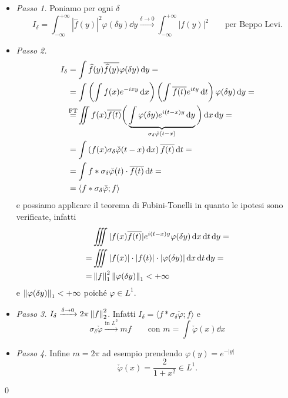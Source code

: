 \begin{itemize}

	\item \textit{Passo 1.} 
	Poniamo per ogni $\delta$
	$$
		I_\delta = \int_{-\infty}^{+\infty} |\hat f(y)|^2 \varphi(\delta y) \dd y
		\xrightarrow{\delta \to 0}
		\int_{-\infty}^{+\infty} |f(y)|^2 \qquad \text{per Beppo Levi.}
	$$

	\item \textit{Passo 2.}
		$$
		\begin{aligned}
			I_\delta 
			&= \int \hat f(y) \overline{\hat f(y)} \varphi(\delta y) \dd y = \\
			&= \int \left( \int f(x) e^{-ixy} \dd x \right) \left( \int \overline{f(t)} e^{ity} \dd t \right) \varphi(\delta y) \dd y = \\
			&\overset{\mathclap{\text{FT}}}{=} 
			\iint f(x) \overline{f(t)} 
			\bigg( \underbrace{\int \varphi(\delta y) e^{i(t-x)y} \dd y}_{\sigma_\delta \check \varphi(t - x)} \bigg)
			\dd x \dd y = \\
			&= \int \left( f(x) \sigma_\delta \check\varphi(t - x) \dd x \right) \overline{f(t)} \dd t =\\
			&= \int f \ast \sigma_\delta \check \varphi(t) \cdot \overline{f(t)} \dd t = \\
			&= \langle f \ast \sigma_\delta \check \varphi; f \rangle \\
		\end{aligned}
		$$
		e possiamo applicare il teorema di Fubini-Tonelli in quanto le ipotesi sono verificate, infatti
		$$
		\begin{aligned}
			&\iiint |f(x) \overline{f(t)}| e^{i(t - x)y} \varphi(\delta y) \,\mathrm{d} x \,\mathrm{d} t \,\mathrm{d} y = \\
			= &\iiint |f(x)| \cdot |f(t)| \cdot |\varphi(\delta y)| \,\mathrm{d} x \,\mathrm{d} t \,\mathrm{d} y = \\
			= &\left\lVert f \right\rVert_1^2 \left\lVert \varphi(\delta y) \right\rVert_1 < +\infty
		\end{aligned}
		$$
		e $\left\lVert \varphi(\delta y) \right\rVert_1 < +\infty$ poiché $\varphi \in L^1$.

	\item \textit{Passo 3.}
		$I_\delta \xrightarrow{\delta \to 0} 2\pi \left\lVert f \right\rVert_2^2 $. Infatti $I_\delta = \langle f \ast \sigma_\delta \check \varphi; f \rangle$ e
		$$
		\sigma_\delta \check \varphi \xrightarrow{\text{in $L^2$}} m f
		\qquad
		\text{con }
		m = \int \check \varphi(x) \dd x
		$$

	\item \textit{Passo 4.}
		Infine $m = 2\pi$ ad esempio prendendo $\varphi(y) = e^{-|y|}$
		$$
			\check\varphi(x) = \frac{2}{1 + x^2} \in L^1.
		$$
\end{itemize}
\qed

